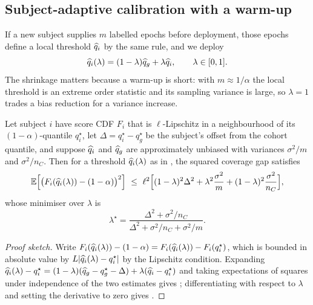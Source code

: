 \subsection{Subject-adaptive calibration with a warm-up}
\label{sec:method-sacp}

If a new subject supplies $m$ labelled epochs before deployment, those epochs
define a local threshold $\widehat{q}_i$ by the same rule, and we deploy
\begin{equation}
\widehat{q}_i(\lambda)=(1-\lambda)\widehat{q}_g+\lambda\widehat{q}_i,
\qquad \lambda\in[0,1].
\label{eq:shrunk-q}
\end{equation}
The shrinkage matters because a warm-up is short: with $m\approx 1/\alpha$
the local threshold is an extreme order statistic and its sampling variance
is large, so $\lambda=1$ trades a bias reduction for a variance increase.

\begin{proposition}
\label{prop:shrinkage}
Let subject $i$ have score CDF $F_i$ that is $\ell$-Lipschitz in a neighbourhood
of its $(1-\alpha)$-quantile $q_i^\star$, let $\Delta=q_i^\star-q_g^\star$ be
the subject's offset from the cohort quantile, and suppose $\widehat{q}_i$ and
$\widehat{q}_g$ are approximately unbiased with variances $\sigma^2/m$ and
$\sigma^2/n_C$. Then for a threshold $\widehat{q}_i(\lambda)$ as in
, the squared coverage gap satisfies
\begin{equation}
\mathbb{E}\Big[\big(F_i(\widehat{q}_i(\lambda))-(1-\alpha)\big)^2\Big]
\ \le\ \ell^2\Big[(1-\lambda)^2\Delta^2+\lambda^2\frac{\sigma^2}{m}
 +(1-\lambda)^2\frac{\sigma^2}{n_C}\Big],
\label{eq:shrink-bound}
\end{equation}
whose minimiser over $\lambda$ is
\begin{equation}
\lambda^\star=\frac{\Delta^2+\sigma^2/n_C}{\Delta^2+\sigma^2/n_C+\sigma^2/m}.
\label{eq:lambda-star}
\end{equation}
\end{proposition}

\begin{proof}[Proof sketch]
Write $F_i(\widehat{q}_i(\lambda))-(1-\alpha)=F_i(\widehat{q}_i(\lambda))-F_i(q_i^\star)$,
which is bounded in absolute value by $L|\widehat{q}_i(\lambda)-q_i^\star|$ by the
Lipschitz condition. Expanding $\widehat{q}_i(\lambda)-q_i^\star
=(1-\lambda)(\widehat{q}_g-q_g^\star-\Delta)+\lambda(\widehat{q}_i-q_i^\star)$ and taking
expectations of squares under independence of the two estimates gives
; differentiating with respect to $\lambda$ and setting
the derivative to zero gives .
\end{proof}

